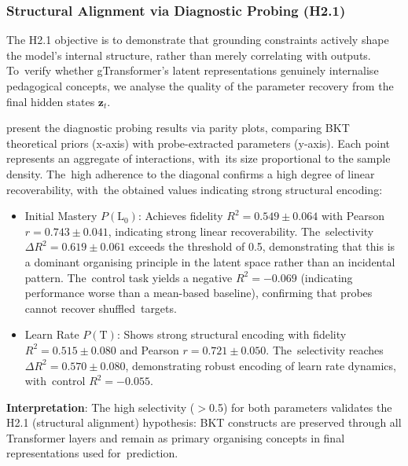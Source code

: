 \documentclass[applsci,article,accept,moreauthors,pdftex]{Definitions/mdpi}
\begin{document}
\subsubsection{Structural Alignment via Diagnostic Probing (H2.1)} \label{sec_structural_alignment}

The H2.1 objective is to demonstrate that grounding constraints actively shape the model's internal structure, rather than merely correlating with outputs. To~verify whether gTransformer's latent representations genuinely internalise pedagogical concepts, we analyse the quality of the parameter recovery from the final hidden states $\mathbf{z}_t$. 

 present the diagnostic probing results via parity plots, comparing BKT theoretical priors (x-axis) with probe-extracted parameters (y-axis). Each point represents an aggregate of interactions, with~its size proportional to the sample density. The~high adherence to the diagonal confirms a high degree of linear recoverability, with~the obtained values indicating strong structural encoding:


\begin{itemize}
    \item Initial Mastery $P(\text{L}_0)$: Achieves fidelity $R^2 = 0.549 \pm 0.064$ with Pearson \mbox{$r = 0.743 \pm 0.041$}, indicating strong linear recoverability. The~selectivity $\Delta R^2 = 0.619 \pm 0.061$ exceeds the threshold of 0.5, demonstrating that this is a dominant organising principle in the latent space rather than an incidental pattern. The~control task yields a negative $R^2 = -0.069$ (indicating performance worse than a mean-based baseline), confirming that probes cannot recover shuffled~targets.
    
    \item Learn Rate $P(\text{T})$: Shows strong structural encoding with fidelity \mbox{$R^2 = 0.515 \pm 0.080$} and Pearson $r = 0.721 \pm 0.050$. The~selectivity reaches $\Delta R^2 = 0.570 \pm 0.080$, demonstrating robust encoding of learn rate dynamics, with~control $R^2 = -0.055$.
\end{itemize}

\textbf{Interpretation}: The high selectivity ($>$0.5) for both parameters validates the H2.1 (structural alignment) hypothesis: BKT constructs are preserved through all Transformer layers and remain as primary organising concepts in final representations used for~prediction. 
\end{document}
